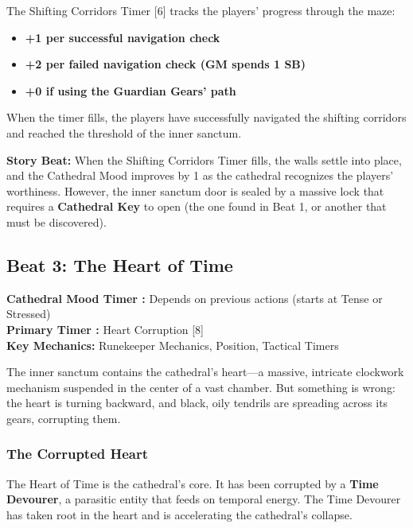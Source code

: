 \documentclass{article}
\begin{document}
The Shifting Corridors Timer [6] tracks the players' progress through the maze:

\begin{itemize}
    \item \textbf{+1 per successful navigation check}
    \item \textbf{+2 per failed navigation check (GM spends 1 SB)}
    \item \textbf{+0 if using the Guardian Gears' path}
\end{itemize}

When the timer fills, the players have successfully navigated the shifting corridors and reached the threshold of the inner sanctum.

\begin{storybox}
\textbf{Story Beat:} When the Shifting Corridors Timer fills, the walls settle into place, and the Cathedral Mood improves by 1 as the cathedral recognizes the players' worthiness. However, the inner sanctum door is sealed by a massive lock that requires a \textbf{Cathedral Key} to open (the one found in Beat 1, or another that must be discovered).
\end{storybox}

\subsection{Beat 3: The Heart of Time}

\begin{mechanicbox}
\textbf{Cathedral Mood Timer :} Depends on previous actions (starts at Tense or Stressed) \\
\textbf{Primary Timer :} Heart Corruption [8] \\
\textbf{Key Mechanics:} Runekeeper Mechanics, Position, Tactical Timers
\end{mechanicbox}

The inner sanctum contains the cathedral's heart---a massive, intricate clockwork mechanism suspended in the center of a vast chamber. But something is wrong: the heart is turning backward, and black, oily tendrils are spreading across its gears, corrupting them.

\subsubsection{The Corrupted Heart}

The Heart of Time is the cathedral's core. It has been corrupted by a \textbf{Time Devourer}, a parasitic entity that feeds on temporal energy. The Time Devourer has taken root in the heart and is accelerating the cathedral's collapse.
\end{document}

